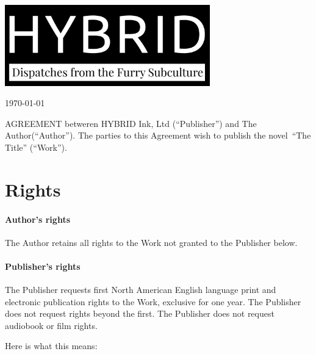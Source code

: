 \documentclass[12pt,letterpaper]{article}
\def\WorkTitle{The Title}
\def\WorkAuthor{The Author}
\def\WorkType{novel}
\begin{document}
\noindent\includegraphics[width=3.5in]{logo}

\vspace{1in}

\today

\vspace{0.5in}

AGREEMENT betweren HYBRID Ink, Ltd (``Publisher'') and \WorkAuthor (``Author''). The parties to this Agreement wish to publish the \WorkType\ ``\WorkTitle'' (``Work'').

\section{Rights}

\paragraph{Author's rights}

The Author retains all rights to the Work not granted to the Publisher below.

\paragraph{Publisher's rights}

The Publisher requests first North American English language print and electronic publication rights to the Work, exclusive for one year. The Publisher does not request rights beyond the first. The Publisher does not request audiobook or film rights.

Here is what this means:
\end{document}
